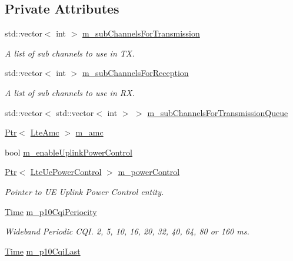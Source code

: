 \subsection*{Private Attributes}
\begin{DoxyCompactItemize}
\item 
std\+::vector$<$ int $>$ \hyperlink{classns3_1_1LteUePhy_ae057eff28e40e2eff2b57d0cb8b03596}{m\+\_\+sub\+Channels\+For\+Transmission}
\begin{DoxyCompactList}\small\item\em A list of sub channels to use in TX. \end{DoxyCompactList}\item 
std\+::vector$<$ int $>$ \hyperlink{classns3_1_1LteUePhy_ac59bd01d30fa909ba2ab0ee99ec163c5}{m\+\_\+sub\+Channels\+For\+Reception}
\begin{DoxyCompactList}\small\item\em A list of sub channels to use in RX. \end{DoxyCompactList}\item 
std\+::vector$<$ std\+::vector$<$ int $>$ $>$ \hyperlink{classns3_1_1LteUePhy_a552aae33d3ca8d710bcb83b7aaeb2844}{m\+\_\+sub\+Channels\+For\+Transmission\+Queue}
\item 
\hyperlink{classns3_1_1Ptr}{Ptr}$<$ \hyperlink{classns3_1_1LteAmc}{Lte\+Amc} $>$ \hyperlink{classns3_1_1LteUePhy_ac41d7c77006896a6e9573867fc60f268}{m\+\_\+amc}
\item 
bool \hyperlink{classns3_1_1LteUePhy_a894d55731114732593b7d7eef8cb94b2}{m\+\_\+enable\+Uplink\+Power\+Control}
\item 
\hyperlink{classns3_1_1Ptr}{Ptr}$<$ \hyperlink{classns3_1_1LteUePowerControl}{Lte\+Ue\+Power\+Control} $>$ \hyperlink{classns3_1_1LteUePhy_a60d8441e8e06f624019df3ab9c9c6dec}{m\+\_\+power\+Control}
\begin{DoxyCompactList}\small\item\em Pointer to UE Uplink Power Control entity. \end{DoxyCompactList}\item 
\hyperlink{classns3_1_1Time}{Time} \hyperlink{classns3_1_1LteUePhy_a43fdf08302e7659a495f320c95974c93}{m\+\_\+p10\+Cqi\+Periocity}
\begin{DoxyCompactList}\small\item\em Wideband Periodic C\+QI. 2, 5, 10, 16, 20, 32, 40, 64, 80 or 160 ms. \end{DoxyCompactList}\item 
\hyperlink{classns3_1_1Time}{Time} \hyperlink{classns3_1_1LteUePhy_a360a0a07b343bf1370c5bd99d31dcd2a}{m\+\_\+p10\+Cqi\+Last}

\end{DoxyCompactItemize}
